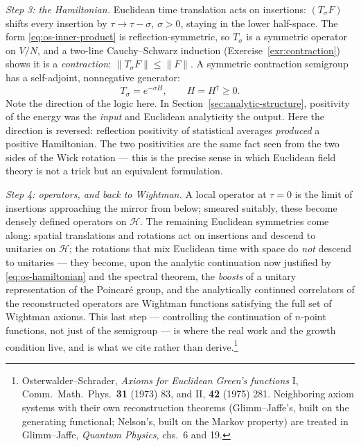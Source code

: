 \emph{Step 3: the Hamiltonian.} Euclidean time translation acts on insertions:
$(T_\sigma F)$ shifts every insertion by $\tau \to \tau - \sigma$, $\sigma > 0$,
staying in the lower half-space. The form \eqref{eq:os-inner-product} is
reflection-symmetric, so $T_\sigma$ is a symmetric operator on $V/N$, and a
two-line Cauchy--Schwarz induction (Exercise~\ref{exr:contraction}) shows it is
a \emph{contraction}: $\|T_\sigma F\| \le \|F\|$. A symmetric contraction
semigroup has a self-adjoint, nonnegative generator:
\begin{equation}
T_\sigma = e^{-\sigma H}, \qquad H = H^\dagger \ge 0 .
\label{eq:os-hamiltonian}
\end{equation}
Note the direction of the logic here. In Section~\ref{sec:analytic-structure},
positivity of the energy was the \emph{input} and Euclidean analyticity the
output. Here the direction is reversed: reflection positivity of statistical
averages \emph{produced} a positive Hamiltonian. The two positivities are the
same fact seen from the two sides of the Wick rotation --- this is the precise
sense in which Euclidean field theory is not a trick but an equivalent
formulation.

\emph{Step 4: operators, and back to Wightman.} A local operator at $\tau = 0$
is the limit of insertions approaching the mirror from below; smeared
suitably, these become densely defined operators on $\mathcal{H}$. The
remaining Euclidean symmetries come along: spatial translations and rotations
act on insertions and descend to unitaries on $\mathcal{H}$; the rotations that
mix Euclidean time with space do \emph{not} descend to unitaries --- they
become, upon the analytic continuation now justified by
\eqref{eq:os-hamiltonian} and the spectral theorem, the \emph{boosts} of a
unitary representation of the Poincar\'e group, and the analytically continued
correlators of the reconstructed operators are Wightman functions satisfying
the full set of Wightman axioms. This last step --- controlling the
continuation of $n$-point functions, not just of the semigroup --- is where the
real work and the growth condition live, and is what we cite rather than
derive.\footnote{Osterwalder--Schrader, \emph{Axioms for Euclidean Green's
functions} I, Comm.\ Math.\ Phys.\ \textbf{31} (1973) 83, and II, \textbf{42}
(1975) 281. Neighboring axiom systems with their own reconstruction theorems
(Glimm--Jaffe's, built on the generating functional; Nelson's, built on the
Markov property) are treated in Glimm--Jaffe, \emph{Quantum Physics},
chs.\ 6 and 19.}

